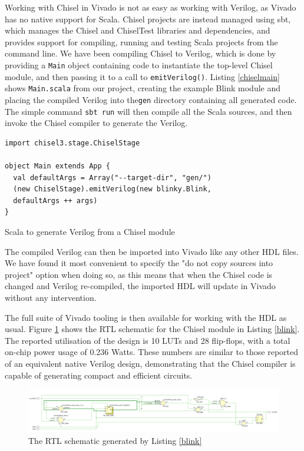 \documentclass[a4paper,fleqn,12pt]{article}
\begin{document}
Working with Chisel in Vivado is not as easy as working with Verilog, as Vivado has no native support for Scala. Chisel projects are instead managed using sbt, which manages the Chisel and ChiselTest libraries and dependencies, and provides support for compiling, running and testing Scala projects from the command line. We have been compiling Chisel to Verilog, which is done by providing a \texttt{Main} object containing code to instantiate the top-level Chisel module, and then passing it to a call to \texttt{emitVerilog()}. Listing \ref{chiselmain} shows \texttt{Main.scala} from our project, creating the example Blink module and placing the compiled Verilog into the\texttt{gen} directory containing all generated code. The simple command \texttt{sbt run} will then compile all the Scala sources, and then invoke the Chisel compiler to generate the Verilog.

\begin{listing}[]
	\vspace{0.5cm}
	\begin{verbatim}
import chisel3.stage.ChiselStage

object Main extends App {
  val defaultArgs = Array("--target-dir", "gen/")
  (new ChiselStage).emitVerilog(new blinky.Blink,
  defaultArgs ++ args)
}
    \end{verbatim}
	\caption{Scala to generate Verilog from a Chisel module}
	\label{chiselmain}
\end{listing}

The compiled Verilog can then be imported into Vivado like any other HDL files. We have found it most convenient to specify the "do not copy sources into project" option when doing so, as this means that when the Chisel code is changed and Verilog re-compiled, the imported HDL will update in Vivado without any intervention.

The full suite of Vivado tooling is then available for working with the HDL as usual. Figure \ref{fig:rtl} shows the RTL schematic for the Chisel module in Listing \ref{blink}. The reported utilisation of the design is 10 LUTs and 28 flip-flops, with a total on-chip power usage of 0.236 Watts. These numbers are similar to those reported of an equivalent native Verilog design, demonstrating that the Chisel compiler is capable of generating compact and efficient circuits.

\begin{figure}[h!]
	\centering
	\includegraphics[width=\textwidth]{../img/blinky-rtl.png}
	\caption{The RTL schematic generated by Listing \ref{blink}}
	\label{fig:rtl}
\end{figure}
\end{document}
